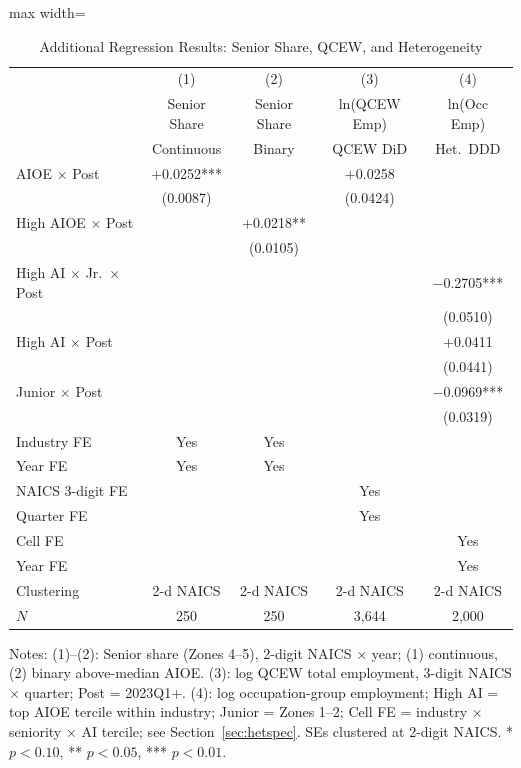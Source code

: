 \documentclass[12pt]{article}
\begin{document}
\begin{table}[H]
\centering
\caption{Additional Regression Results: Senior Share, QCEW, and Heterogeneity}
\label{tab:additional}
\begin{adjustbox}{max width=\textwidth}
\begin{threeparttable}
\begin{tabular}{lcccc}
\toprule
 & (1) & (2) & (3) & (4) \\
 & Senior Share & Senior Share & ln(QCEW Emp) & ln(Occ Emp) \\
 & Continuous & Binary & QCEW DiD & Het.\ DDD \\
\midrule
AIOE $\times$ Post & $+$0.0252*** & & $+$0.0258 & \\
 & (0.0087) & & (0.0424) & \\
High AIOE $\times$ Post & & $+$0.0218** & & \\
 & & (0.0105) & & \\
High AI $\times$ Jr.\ $\times$ Post & & & & $-$0.2705*** \\
 & & & & (0.0510) \\
High AI $\times$ Post & & & & $+$0.0411 \\
 & & & & (0.0441) \\
Junior $\times$ Post & & & & $-$0.0969*** \\
 & & & & (0.0319) \\
\midrule
Industry FE & Yes & Yes & & \\
Year FE & Yes & Yes & & \\
NAICS 3-digit FE & & & Yes & \\
Quarter FE & & & Yes & \\
Cell FE & & & & Yes \\
Year FE & & & & Yes \\
Clustering & 2-d NAICS & 2-d NAICS & 2-d NAICS & 2-d NAICS \\
$N$ & 250 & 250 & 3,644 & 2,000 \\
\bottomrule
\end{tabular}
\begin{tablenotes}[flushleft]
\small
\item Notes: (1)--(2): Senior share (Zones 4--5), 2-digit NAICS $\times$ year; (1) continuous, (2) binary above-median AIOE. (3): log QCEW total employment, 3-digit NAICS $\times$ quarter; Post = 2023Q1+. (4): log occupation-group employment; High AI = top AIOE tercile within industry; Junior = Zones 1--2; Cell FE = industry $\times$ seniority $\times$ AI tercile; see Section~\ref{sec:hetspec}. SEs clustered at 2-digit NAICS. * $p<0.10$, ** $p<0.05$, *** $p<0.01$.
\end{tablenotes}
\end{threeparttable}
\end{adjustbox}
\end{table}
\end{document}
